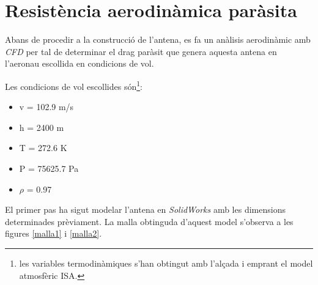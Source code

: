 \section{Resistència aerodinàmica paràsita}
Abans de procedir a la construcció de l'antena, es fa un anàlisis aerodinàmic amb \textit{CFD} per tal de determinar el drag paràsit que genera aquesta antena en l'aeronau escollida en condicions de vol.

Les condicions de vol escollides són\footnote{les variables termodinàmiques s'han obtingut amb l'alçada i emprant el model atmosfèric ISA.}:
\begin{itemize}
\item v = 102.9 m/s
\item h = 2400 m
\item T = 272.6 K
\item P = 75625.7 Pa
\item $\rho$ = 0.97
\end{itemize}

El primer pas ha sigut modelar l'antena en \textit{SolidWorks} amb les dimensions determinades prèviament. La malla obtinguda d'aquest model s'observa a les figures \ref{malla1} i \ref{malla2}.

